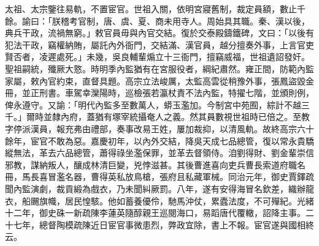 \begin{pinyinscope}
太祖、太宗鑒往易軌，不置宦官。世祖入關，依明宮寢舊制，裁定員額，數止千餘。諭曰：「朕稽考官制，唐、虞、夏、商未用寺人。周始具其職。秦、漢以後，典兵干政，流禍無窮。」敕官員毋與內官交結。復於交泰殿鑄鐵碑，文曰：「以後有犯法干政，竊權納賄，屬託內外衙門，交結滿、漢官員，越分擅奏外事，上言官吏賢否者，凌遲處死。」未幾，吳良輔輩煽立十三衙門，擅竊威福，世祖遺詔發奸。聖祖嗣統，殲厥大憝。時明季內監猶有在宮服役者，綱紀肅然。雍正間，防範內監家屬，敕內官約束，直督具題。高宗立法峻厲，太監高雲從稍豫外事，張鳳盜毀金冊，並正刑書。車駕幸灤陽時，巡檢張若瀛杖責不法內監，特擢七階，並頒則例，俾永遵守。又諭：「明代內監多至數萬人，蟒玉濫加。今制宮中苑囿，綜計不越三千。」爾時並隸內府，蓋猶有塚宰統攝奄人之義。然其員數視世祖時已倍之。至教字停派漢員，報充弗由禮部，奏事改易王姓，屢加裁抑，以清風軌。故終高宗六十餘年，宦官不敢為惡。嘉慶初年，以內外交結，降吳天成七品總管，復以常永貴驕縱無法，革去六品總管，蕭得祿坐濫保罪，並革去督領侍。洎劉得財、劉金輩崇信邪教，謀納叛人，釀成林清巨變，兇悖滋甚。其後曹進喜向吏兵曹長索道府職名冊，馬長喜冒濫名器，曹得英私放鳥槍，張府且私藏軍械。同治元年，御史賈鐸疏聞內監演劇，裁貢緞為戲衣，乃未聞糾厥罰。八年，遂有安得海冒名欽差，織辦龍衣，船颺旗幟，居民惶駭。他如蓄養優伶，馳馬沖仗，累蠹法度，不可殫紀。光緒十二年，御史硃一新疏陳李蓮英隨醇親王巡閱海口，易蹈唐代覆轍，詔降主事。二十七年，總督陶模疏陳近日宦官事微患烈，弊政宜除，書上不報。宦官遂與國相終云。


\end{pinyinscope}